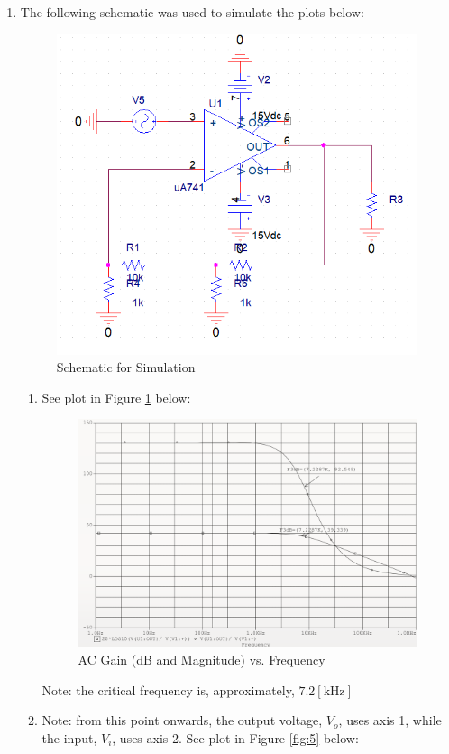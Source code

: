 \begin{enumerate}
  \item The following schematic was used to simulate the plots below:

    \begin{figure}[H]
      \centering
      \includegraphics[width=.6\textwidth]{Figures/HW2-6.png}
      \caption{Schematic for Simulation}
      \label{fig:3}
    \end{figure}

    \begin{enumerate}

      \item See plot in Figure \ref{fig:3} below:

        \begin{figure}[H]
          \centering
          \includegraphics[width=.8\textwidth]{Figures/HW2-6a.png}
          \caption{AC Gain (dB and Magnitude) vs. Frequency}
          \label{fig:4}
        \end{figure}

        Note: the critical frequency is, approximately, $7.2[\si{\kilo\hertz}]$

      \item Note: from this point onwards, the output voltage, $V_o$, uses axis 1, while the input, $V_i$, uses axis 2. See plot in Figure \ref{fig:5} below:


\end{enumerate}
\end{enumerate}
